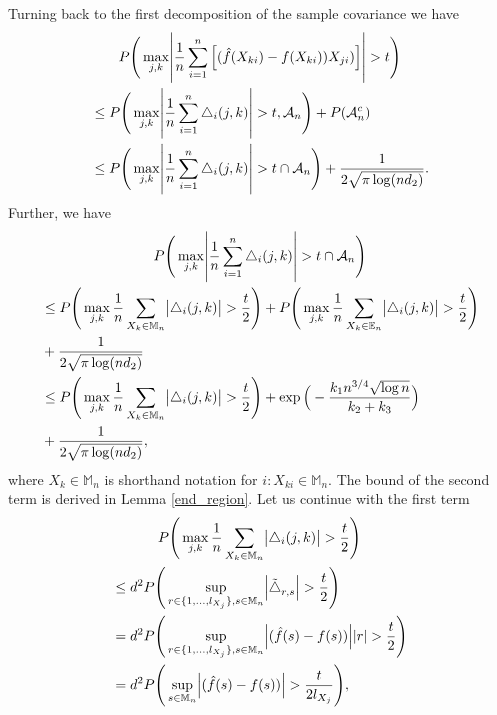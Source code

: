 Turning back to the first decomposition of the sample covariance we have
\begin{multline*}
    P\Bigg(\max_{j,k}\abs{\frac{1}{n}\sum_{i=1}^n \Big[(\hat{f}(X_{ki}) - f(X_{ki}))X_{ji})\Big]} > t \Bigg) \\
    \begin{aligned}
        &\leq P\Bigg(\max_{j,k}\abs{\frac{1}{n}\sum_{i=1}^n \bigtriangleup_i(j,k)} > t, \mathcal{A}_n \Bigg) + P(\mathcal{A}_n^c) \\
        &\leq P\Bigg(\max_{j,k}\abs{\frac{1}{n}\sum_{i=1}^n \bigtriangleup_i(j,k)} > t \cap \mathcal{A}_n\Bigg) + \frac{1}{2\sqrt{\pi \log(nd_2)}}. 
    \end{aligned}
\end{multline*}
Further, we have
\begin{multline*}
    P\Bigg(\max_{j,k}\abs{\frac{1}{n}\sum_{i=1}^n \bigtriangleup_i(j,k)} > t \cap \mathcal{A}_n\Bigg) \\
    \begin{aligned}
    &\leq P\Bigg(\max_{j,k} \frac{1}{n} \sum_{X_k \in \mathbb{M}_n} \abs{\bigtriangleup_i(j,k)} > \frac{t}{2}\Bigg) + P\Bigg(\max_{j,k} \frac{1}{n} \sum_{X_k \in \mathbb{E}_n} \abs{\bigtriangleup_i(j,k)} > \frac{t}{2}\Bigg) \\
    &+ \frac{1}{2\sqrt{\pi \log(nd_2)}} \\
    &\leq P\Bigg(\max_{j,k} \frac{1}{n} \sum_{X_k \in \mathbb{M}_n} \abs{\bigtriangleup_i(j,k)} > \frac{t}{2}\Bigg) + \exp\Big(- \frac{k_1 n^{3/4} \sqrt{\log n}}{k_2+ k_3} \Big) \\
    &+ \frac{1}{2\sqrt{\pi \log(nd_2)}},
    \end{aligned}
\end{multline*}
where $X_k \in \mathbb{M}_n$ is shorthand notation for $i:X_{ki} \in \mathbb{M}_n$. The bound of the second term is derived in Lemma \ref{end_region}. Let us continue with the first term
\begin{multline*}
        P\Bigg(\max_{j,k} \frac{1}{n} \sum_{X_k \in \mathbb{M}_n} \abs{\bigtriangleup_i(j,k)} > \frac{t}{2}\Bigg) \\
        \begin{aligned}
        &\leq d^2P\Bigg(\sup_{r \in \{1,\dots, l_{X_j}\},s \in \mathbb{M}_n} \abs{\tilde{\bigtriangleup}_{r,s}} > \frac{t}{2}\Bigg) \\
        &= d^2P\Bigg(\sup_{r \in \{1,\dots, l_{X_j}\},s \in \mathbb{M}_n} \abs{(\hat{f}(s) - f(s))}\abs{r} > \frac{t}{2}\Bigg) \\
        &= d^2P\Bigg(\sup_{s \in \mathbb{M}_n} \abs{(\hat{f}(s) - f(s))} > \frac{t}{2l_{X_j}}\Bigg),
        \end{aligned}
\end{multline*}
